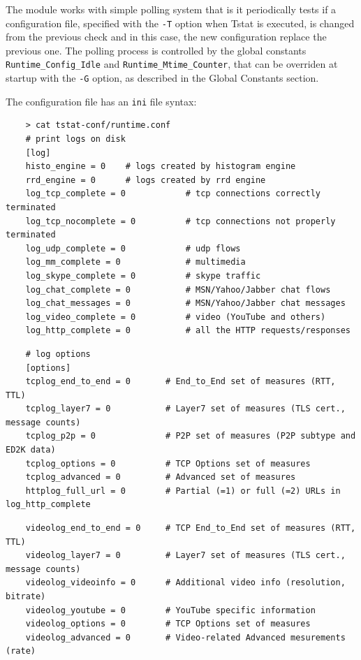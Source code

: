 \documentclass[11pt]{article}
\begin{document}
The module works with simple polling system that is it periodically tests if a configuration file,
specified with the \texttt{-T} option when Tstat is executed, is changed from the previous check
and in this case, the new configuration replace the previous one.
The polling process is controlled by the global constants \texttt{Runtime\_Config\_Idle} and 
\texttt{Runtime\_Mtime\_Counter}, that can be overriden at startup with the \texttt{-G} option, as described
in the \textsf{Global Constants} section.



The configuration file has an \texttt{ini} file syntax:

\begin{small}\begin{verbatim}
    > cat tstat-conf/runtime.conf
    # print logs on disk
    [log]
    histo_engine = 0    # logs created by histogram engine
    rrd_engine = 0      # logs created by rrd engine
    log_tcp_complete = 0            # tcp connections correctly terminated
    log_tcp_nocomplete = 0          # tcp connections not properly terminated
    log_udp_complete = 0            # udp flows
    log_mm_complete = 0             # multimedia 
    log_skype_complete = 0          # skype traffic
    log_chat_complete = 0           # MSN/Yahoo/Jabber chat flows
    log_chat_messages = 0           # MSN/Yahoo/Jabber chat messages
    log_video_complete = 0          # video (YouTube and others)
    log_http_complete = 0           # all the HTTP requests/responses
\end{verbatim}\end{small} \noindent
\begin{small}\begin{verbatim}
    # log options
    [options]
    tcplog_end_to_end = 0       # End_to_End set of measures (RTT, TTL)
    tcplog_layer7 = 0           # Layer7 set of measures (TLS cert., message counts)
    tcplog_p2p = 0              # P2P set of measures (P2P subtype and ED2K data)
    tcplog_options = 0          # TCP Options set of measures
    tcplog_advanced = 0         # Advanced set of measures
    httplog_full_url = 0        # Partial (=1) or full (=2) URLs in log_http_complete
\end{verbatim}\end{small} \noindent
\begin{small}\begin{verbatim}
    videolog_end_to_end = 0     # TCP End_to_End set of measures (RTT, TTL)
    videolog_layer7 = 0         # Layer7 set of measures (TLS cert., message counts)
    videolog_videoinfo = 0      # Additional video info (resolution, bitrate)
    videolog_youtube = 0        # YouTube specific information
    videolog_options = 0        # TCP Options set of measures
    videolog_advanced = 0       # Video-related Advanced mesurements (rate)
\end{verbatim}\end{small} \noindent
\end{document}
